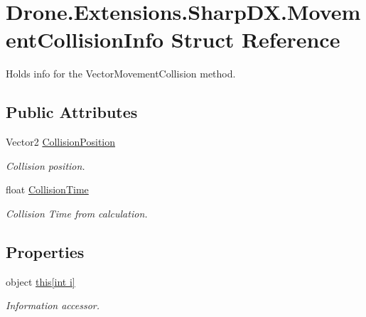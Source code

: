 \hypertarget{struct_drone_1_1_extensions_1_1_sharp_d_x_1_1_movement_collision_info}{}\section{Drone.\+Extensions.\+Sharp\+D\+X.\+Movement\+Collision\+Info Struct Reference}
\label{struct_drone_1_1_extensions_1_1_sharp_d_x_1_1_movement_collision_info}


Holds info for the Vector\+Movement\+Collision method.  


\subsection*{Public Attributes}
\begin{DoxyCompactItemize}
\item 
Vector2 \hyperlink{struct_drone_1_1_extensions_1_1_sharp_d_x_1_1_movement_collision_info_a0d281f28c9b8bdfe6f7965a1d3a61508}{Collision\+Position}
\begin{DoxyCompactList}\small\item\em Collision position. \end{DoxyCompactList}\item 
float \hyperlink{struct_drone_1_1_extensions_1_1_sharp_d_x_1_1_movement_collision_info_a5da0c6cf95e3f8730e0d996e58befa14}{Collision\+Time}
\begin{DoxyCompactList}\small\item\em Collision Time from calculation. \end{DoxyCompactList}\end{DoxyCompactItemize}
\subsection*{Properties}
\begin{DoxyCompactItemize}
\item 
object \hyperlink{struct_drone_1_1_extensions_1_1_sharp_d_x_1_1_movement_collision_info_ab03a172c8d544d9b00710163c86bcf71}{this\mbox{[}int i\mbox{]}}
\begin{DoxyCompactList}\small\item\em Information accessor. \end{DoxyCompactList}\end{DoxyCompactItemize}


